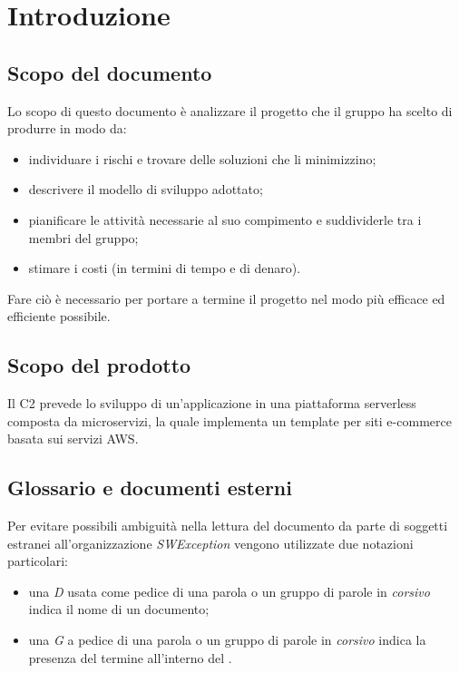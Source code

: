 \section{Introduzione} \label{_introduzione}

\subsection{Scopo del documento}
Lo scopo di questo documento è analizzare il progetto che il gruppo ha scelto di produrre in modo da:
\begin{itemize}
    \item individuare i rischi e trovare delle soluzioni che li minimizzino;
    \item descrivere il modello di sviluppo adottato;
    \item pianificare le attività necessarie al suo compimento e suddividerle tra i membri del gruppo;
    \item stimare i costi (in termini di tempo e di denaro).
\end{itemize}
Fare ciò è necessario per portare a termine il progetto nel modo più efficace ed efficiente possibile.

\subsection{Scopo del prodotto}
Il  C2 prevede lo sviluppo di un'applicazione in una piattaforma serverless composta da microservizi, la quale implementa un template per siti e-commerce basata sui servizi AWS.

\subsection{Glossario  e documenti esterni}
Per evitare possibili ambiguità nella lettura del documento da parte di soggetti estranei all'organizzazione \textit{SWException} vengono utilizzate due notazioni particolari:
\begin{itemize}
    \item una \textit{D} usata come pedice di una parola o un gruppo di parole in \textit{corsivo} indica il nome di un documento;
    \item una \textit{G} a pedice di una parola o un gruppo di parole in \textit{corsivo} indica la presenza del termine all'interno del .
\end{itemize}

